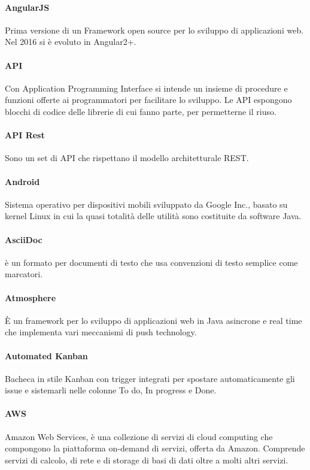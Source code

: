 \documentclass[]{article}
\begin{document}
	\paragraph*{AngularJS}
	Prima versione di un Framework open source per lo sviluppo di applicazioni web. Nel 2016 si è evoluto in Angular2+.

	\paragraph*{API}
	Con Application Programming Interface si intende un insieme di procedure e funzioni offerte ai programmatori per facilitare lo sviluppo. Le API espongono blocchi di codice delle librerie di cui fanno parte, per permetterne il riuso.

	\paragraph*{API Rest}
	Sono un set di API che rispettano il modello architetturale REST.

	\paragraph*{Android}
	Sistema operativo per dispositivi mobili sviluppato da Google Inc., basato su kernel Linux in cui la quasi totalità delle utilità sono costituite da software Java.
	
	\paragraph*{AsciiDoc}
	è un formato per documenti di testo che usa convenzioni di testo semplice come marcatori.

	\paragraph*{Atmosphere}
	È un framework per lo sviluppo di applicazioni web in Java asincrone e real time che implementa vari meccanismi di push technology.

	\paragraph*{Automated Kanban}
	Bacheca in stile Kanban con trigger integrati per spostare automaticamente gli issue e sistemarli nelle colonne To do, In progress e Done.

	\paragraph*{AWS}
	Amazon Web Services, è una collezione di servizi di cloud computing che compongono la piattaforma on-demand di servizi, offerta da Amazon.	Comprende servizi di calcolo, di rete e di storage di basi di dati oltre a molti altri servizi.
\end{document}
